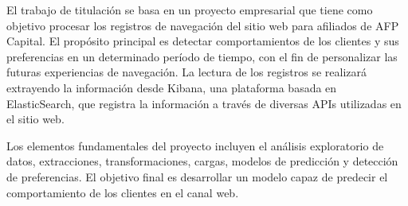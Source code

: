 El trabajo de titulación se basa en un proyecto empresarial que tiene como objetivo procesar los registros de navegación del sitio web para afiliados de AFP Capital. El propósito principal es detectar comportamientos de los clientes y sus preferencias en un determinado período de tiempo, con el fin de personalizar las futuras experiencias de navegación. La lectura de los registros se realizará extrayendo la información desde Kibana, una plataforma basada en ElasticSearch, que registra la información a través de diversas APIs utilizadas en el sitio web.

Los elementos fundamentales del proyecto incluyen el análisis exploratorio de datos, extracciones, transformaciones, cargas, modelos de predicción y detección de preferencias. El objetivo final es desarrollar un modelo capaz de predecir el comportamiento de los clientes en el canal web.